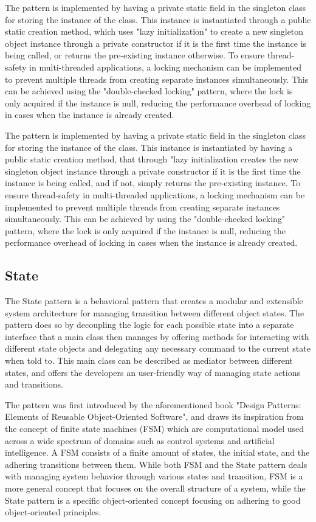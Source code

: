    The pattern is implemented by having a private static field in the singleton class for storing the instance of the class. This instance is instantiated through a public static creation method, which uses "lazy initialization" to create a new singleton object instance through a private constructor if it is the first time the instance is being called, or returns the pre-existing instance otherwise. To ensure thread-safety in multi-threaded applications, a locking mechanism can be implemented to prevent multiple threads from creating separate instances simultaneously. This can be achieved using the "double-checked locking" pattern, where the lock is only acquired if the instance is null, reducing the performance overhead of locking in cases when the instance is already created.

    The pattern is implemented by having a private static field in the singleton class for storing the instance of the class. This instance is instantiated by having a public static creation method, that through "lazy initialization creates the new singleton object instance through a private constructor if it is the first time the instance is being called, and if not, simply returns the pre-existing instance. To ensure thread-safety in multi-threaded applications, a locking mechanism can be implemented to prevent multiple threads from creating separate instances simultaneously. This can be achieved by using the "double-checked locking" pattern, where the lock is only acquired if the instance is null, reducing the performance overhead of locking in cases when the instance is already created.

\subsection{State}
    The State pattern is a behavioral pattern that creates a modular and extensible system architecture for managing transition between different object states. The pattern does so by decoupling the logic for each possible state into a separate interface that a main class then manages by offering methods for interacting with different state objects and delegating any necessary command to the current state when told to. This main class can be described as mediator between different states, and offers the developers an user-friendly way of managing state actions and transitions.

    The pattern was first introduced by the aforementioned book "Design Patterns: Elements of Reusable Object-Oriented Software", and draws its inspiration from the concept of finite state machines (FSM) which are computational model used across a wide spectrum of domains such as control systems and artificial intelligence. A FSM consists of a finite amount of states, the initial state, and the adhering transitions between them. While both FSM and the State pattern deals with managing system behavior through various states and transition, FSM is a more general concept that focuses on the overall structure of a system, while the State pattern is a specific object-oriented concept focusing on adhering to good object-oriented principles.

